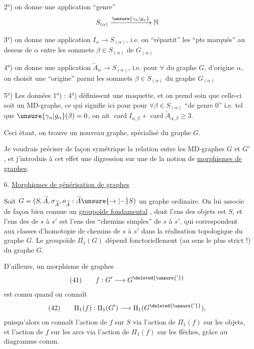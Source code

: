 2°) on  donne une application ``genre''
\[
S_{(\alpha)}\xrightarrow{\unsure{\gamma_\alpha|g_\alpha}}\mathbb N
\]

3°) on donne une application $I_\alpha\to S_{(\alpha)}$, i.e. on ``répartit'' les  ``pts marqués'' au dessus de $\alpha$  entre les sommets $\beta\in S_{(\alpha)}$ de $G_{(\alpha)}$

4°) on donne une application $\widetilde A_\alpha\to S_{(\alpha)}$, i.e. pour $\forall$  du graphe $G$, d'origine $\alpha$, on  choisit une  ``origine'' parmi les sommets $\beta\in S_{(\alpha)}$ du graphe $G_{(\alpha)}$

5°) Les données 1°) : 4°) définissent une maquette,  et on prend soin que celle-ci soit un MD-graphe,  ce qui signifie ici pour pour $\forall\beta\in S_{(\alpha)}$ ``de genre 0'' i.e. tel que $\unsure{\gamma_\alpha|g_\alpha}(\beta)=0$, on ait $\operatorname{card}I_{\alpha,\beta}+\operatorname{card}\widetilde A_{\alpha,\beta}\geq 3$.

Ceci étant, on trouve un nouveau graphe,  spécialisé du graphe $G$.

Je voudrais préciser de façon symétrique la relation entre les MD-graphes $G$ et $G'$, et j'introduis à cet effet une digression sur
une  de la notion de \uline{morphismes de graphes}.

\qquad{}

6. \uline{Morphismes de générisation de graphes }

Soit $G=(S,\widetilde A,\sigma_{\widetilde A},o_{\widetilde A}:\widetilde A\unsure{\to|{-}}S)$ un graphe ordinaire. On lui associe de façon bien connue un \uline{groupoïde fondamental} , dont l'ens des objets est $S$, et l'ens des  de $s$ à $s'$ est l'ens des ``chemins simples'' de $s$ à $s'$, qui correspondent aux classes d'homotopie de chemins de $s$ à $s'$ dans la réalisation topologique du graphe $G$. Le groupoïde $\Pi_1(G)$ dépend fonctoriellement (au sens le plus strict !) du graphe $G$.

D'ailleurs, un morphisme de graphes
\[
(41)\qquad f:G'\longrightarrow G^{\deleted{\unsure{'}}}
\]
est connu quand on connaît
\[
(42)\qquad\Pi_1(f):\Pi_1(G')\longrightarrow\Pi_1(G^{\deleted{\unsure{'}}}),
\]
puisqu'alors on connaît l'action de $f$ sur $S$ via l'action de $\Pi_1(f)$ sur les objets, et l'action de $f$ sur les arcs via l'action de $\Pi_1(f)$ sur les flèches, grâce au diagramme comm.

